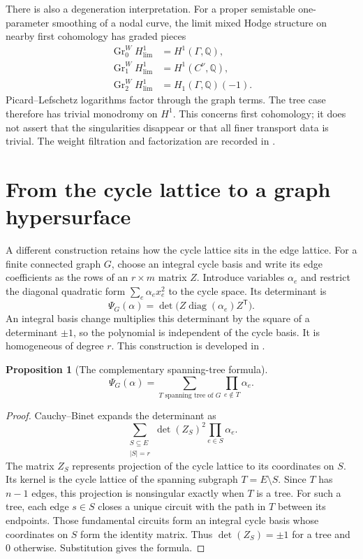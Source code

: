 \documentclass[11pt]{article}
\newtheorem{proposition}[theorem]{Proposition}
\theoremstyle{definition}
\theoremstyle{remark}
\newcommand{\Q}{\mathbb Q}
\begin{document}
There is also a degeneration interpretation.  For a proper semistable one-parameter
smoothing of a nodal curve, the limit mixed Hodge structure on nearby
first cohomology has graded pieces
\[
\begin{split}
  \operatorname{Gr}^W_0H^1_{\mathrm{lim}}&=H^1(\Gamma,\Q),\\
  \operatorname{Gr}^W_1H^1_{\mathrm{lim}}&=H^1(C^\nu,\Q),\\
  \operatorname{Gr}^W_2H^1_{\mathrm{lim}}&=H_1(\Gamma,\Q)(-1).
\end{split}
\]
Picard--Lefschetz logarithms factor through the graph terms.  The tree
case therefore has trivial monodromy on $H^1$.  This concerns first
cohomology; it does not assert that the singularities disappear or that
all finer transport data is trivial.  The weight filtration and
factorization are recorded in
\cite[\S6.1, equations (28)--(29), Remark 6.3]{DCHMSupportHitchin}.

\section{From the cycle lattice to a graph hypersurface}
\label{sec:graph-hypersurface}

A different construction retains how the cycle lattice sits in the edge
lattice.  For a finite connected graph $G$, choose an integral cycle
basis and write its edge coefficients as the rows of an $r\times m$
matrix $Z$.  Introduce variables $\alpha_e$ and restrict the diagonal
quadratic form $\sum_e\alpha_e x_e^2$ to the cycle space.  Its determinant
is
\[
  \Psi_G(\alpha)=\det\bigl(Z\operatorname{diag}(\alpha_e)Z^{\mathsf T}\bigr).
\]
An integral basis change multiplies this determinant by the square of a
determinant $\pm1$, so the polynomial is independent of the cycle basis.
It is homogeneous of degree $r$.  This construction is developed in
\cite[\S1--2]{BEKGraphPolynomials}.

\begin{proposition}[The complementary spanning-tree formula]
\[
  \Psi_G(\alpha)=\sum_{T\text{ spanning tree of }G}
       \prod_{e\notin T}\alpha_e.
\]
\end{proposition}

\begin{proof}
Cauchy--Binet expands the determinant as
\[
  \sum_{\substack{S\subseteq E\\|S|=r}}
       \det(Z_S)^2\prod_{e\in S}\alpha_e.
\]
The matrix $Z_S$ represents projection of the cycle lattice to its
coordinates on $S$.  Its kernel is the cycle lattice of the spanning
subgraph $T=E\setminus S$.  Since $T$ has $n-1$ edges, this projection
is nonsingular exactly when $T$ is a tree.  For such a tree, each edge
$s\in S$ closes a unique circuit with the path in $T$ between its
endpoints.  Those fundamental circuits form an integral cycle basis
whose coordinates on $S$ form the identity matrix.  Thus
$\det(Z_S)=\pm1$ for a tree and $0$ otherwise.  Substitution gives the
formula.
\end{proof}
\end{document}
